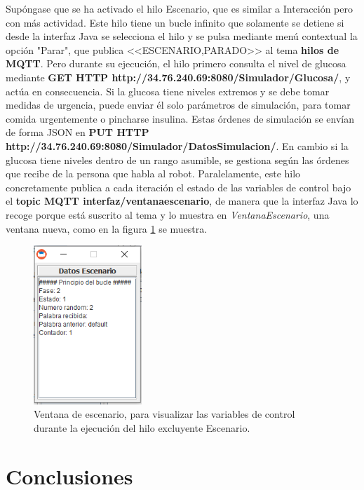 \documentclass[12pt,spanish,listoffigures,listoftables]{tfgetsinf}
\begin{document}
Supóngase que se ha activado el hilo Escenario, que es similar a Interacción pero con más actividad. Este hilo tiene un bucle infinito que solamente se detiene si desde la interfaz Java se selecciona el hilo y se pulsa mediante menú contextual la opción "Parar", que publica <<ESCENARIO,PARADO>> al tema \textbf{hilos de MQTT}. Pero durante su ejecución, el hilo primero consulta el nivel de glucosa mediante \textbf{GET HTTP http://34.76.240.69:8080/Simulador/Glucosa/}, y actúa en consecuencia. Si la glucosa tiene niveles extremos y se debe tomar medidas de urgencia, puede enviar él solo parámetros de simulación, para tomar comida urgentemente o pincharse insulina. Estas órdenes de simulación se envían de forma JSON en \textbf{PUT HTTP http://34.76.240.69:8080/Simulador/DatosSimulacion/}. En cambio si la glucosa tiene niveles dentro de un rango asumible, se gestiona según las órdenes que recibe de la persona que habla al robot. Paralelamente, este hilo concretamente publica a cada iteración el estado de las variables de control bajo el \textbf{topic MQTT interfaz/ventanaescenario}, de manera que la interfaz Java lo recoge porque está suscrito al tema y lo muestra en \textit{VentanaEscenario}, una ventana nueva, como en la figura \ref{figura:ventanaescenario} se muestra.

\begin{figure}[!h]
	\centering
	\includegraphics[height=6cm]{img/ventanaescenario}
	\caption{Ventana de escenario, para visualizar las variables de control durante la ejecución del hilo excluyente Escenario.}
	\label{figura:ventanaescenario}
\end{figure}


\chapter{Conclusiones}
\end{document}
